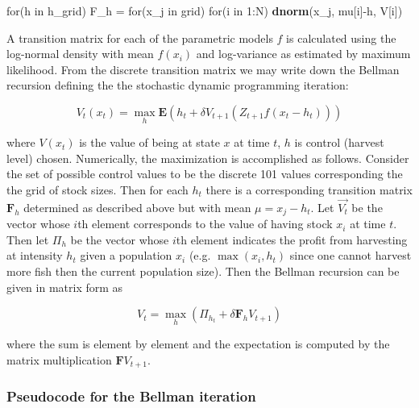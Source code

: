 \documentclass[author-year, review]{elsarticle} %
\newenvironment{Shaded}{}{}
\newcommand{\KeywordTok}[1]{\textcolor[rgb]{0.00,0.44,0.13}{\textbf{{#1}}}}
\newcommand{\DecValTok}[1]{\textcolor[rgb]{0.25,0.63,0.44}{{#1}}}
\newcommand{\StringTok}[1]{\textcolor[rgb]{0.25,0.44,0.63}{{#1}}}
\newcommand{\NormalTok}[1]{{#1}}
\begin{document}
\begin{Shaded}
\begin{Highlighting}[]
\NormalTok{for(h in h_grid)}
  \NormalTok{F_h =}\StringTok{ }\NormalTok{for(x_j in grid)}
          \NormalTok{for(i in }\DecValTok{1}\NormalTok{:N) }
            \KeywordTok{dnorm}\NormalTok{(x_j, mu[i]-h, V[i])}
\end{Highlighting}
\end{Shaded}

A transition matrix for each of the parametric models $f$ is calculated
using the log-normal density with mean $f(x_i)$ and log-variance as
estimated by maximum likelihood. From the discrete transition matrix we
may write down the Bellman recursion defining the the stochastic dynamic
programming iteration:

\begin{equation}
V_t(x_t) = \max_h \mathbf{E} \left( h_t + \delta V_{t+1}( Z_{t+1} f(x_t - h_t)) \right)
\end{equation}

where $V(x_t)$ is the value of being at state $x$ at time $t$, $h$ is
control (harvest level) chosen. Numerically, the maximization is
accomplished as follows. Consider the set of possible control values to
be the discrete 101 values corresponding the the grid of stock sizes.
Then for each $h_t$ there is a corresponding transition matrix
$\mathbf{F}_h$ determined as described above but with mean
$\mu = x_j - h_t$. Let $\vec{V_t}$ be the vector whose $i$th element
corresponds to the value of having stock $x_i$ at time $t$. Then let
$\Pi_h$ be the vector whose $i$th element indicates the profit from
harvesting at intensity $h_t$ given a population $x_i$ (e.g.
$\max(x_i, h_t)$ since one cannot harvest more fish then the current
population size). Then the Bellman recursion can be given in matrix form
as

\[V_{t} = \max_h \left( \Pi_{h_{t}} + \delta \mathbf{F}_h V_{t+1} \right)\]

where the sum is element by element and the expectation is computed by
the matrix multiplication $\mathbf{F} V_{t+1}$.

\subsubsection{Pseudocode for the Bellman iteration}
\end{document}
